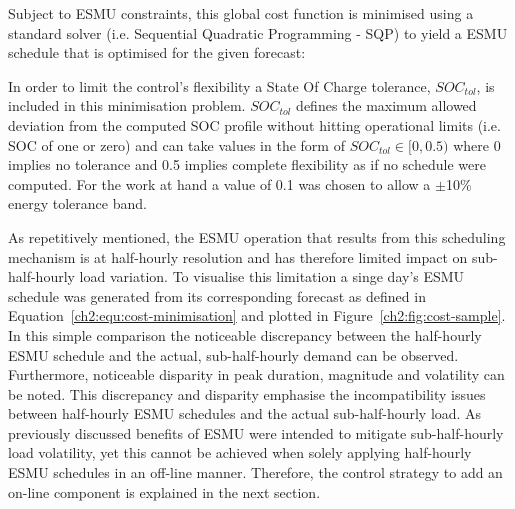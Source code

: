 

Subject to ESMU constraints, this global cost function is minimised using a standard solver (i.e. Sequential Quadratic Programming - SQP) to yield a ESMU schedule that is optimised for the given forecast:



In order to limit the control's flexibility a State Of Charge tolerance, $SOC_{tol}$, is included in this minimisation problem.
$SOC_{tol}$ defines the maximum allowed deviation from the computed SOC profile without hitting operational limits (i.e. SOC of one or zero) and can take values in the form of $SOC_{tol} \in [0, 0.5)$ where 0 implies no tolerance and 0.5 implies complete flexibility as if no schedule were computed.
For the work at hand a value of 0.1 was chosen to allow a $\pm$10\% energy tolerance band.



As repetitively mentioned, the ESMU operation that results from this scheduling mechanism is at half-hourly resolution and has therefore limited impact on sub-half-hourly load variation.
To visualise this limitation a singe day's ESMU schedule was generated from its corresponding forecast as defined in Equation~\ref{ch2:equ:cost-minimisation} and plotted in Figure~\ref{ch2:fig:cost-sample}.
In this simple comparison the noticeable discrepancy between the half-hourly ESMU schedule and the actual, sub-half-hourly demand can be observed.
Furthermore, noticeable disparity in peak duration, magnitude and volatility can be noted.
This discrepancy and disparity emphasise the incompatibility issues between half-hourly ESMU schedules and the actual sub-half-hourly load.
As previously discussed benefits of ESMU were intended to mitigate sub-half-hourly load volatility, yet this cannot be achieved when solely applying half-hourly ESMU schedules in an off-line manner.
Therefore, the control strategy to add an on-line component is explained in the next section.
